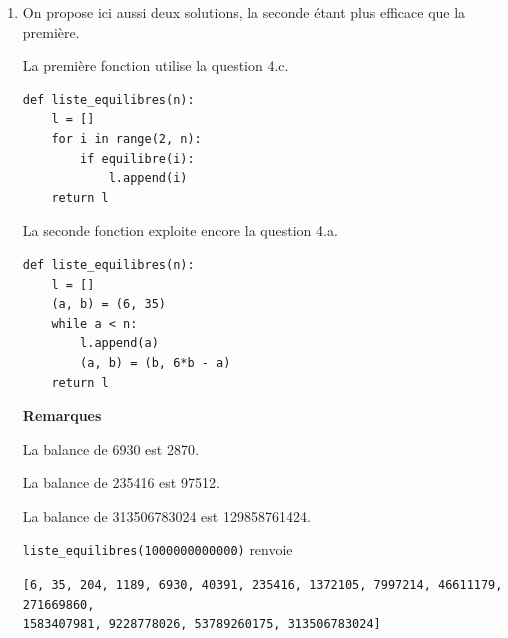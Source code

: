 \begin{enumerate}
\begin{enumerate}
    Mais on peut aussi écrire la fonction suivante, de complexité bien meilleure, en exploitant la question 4.a.
    
    \begin{verbatim}
def equilibre(n):
    (a, b) = (6, 35)
    while a < n:
        (a, b) = (b, 6*b - a)
    return a == n
    \end{verbatim}
\end{enumerate}

\item \textbf{} On propose ici aussi deux solutions, la seconde étant plus efficace que la première.

La première fonction utilise la question 4.c.

\begin{verbatim}
def liste_equilibres(n):
    l = []
    for i in range(2, n):
        if equilibre(i):
            l.append(i)
    return l
\end{verbatim}

La seconde fonction exploite encore la question 4.a.

\begin{verbatim}
def liste_equilibres(n):
    l = []
    (a, b) = (6, 35)
    while a < n:
        l.append(a)
        (a, b) = (b, 6*b - a)
    return l
\end{verbatim}

\textbf{Remarques}

La balance de 6930 est 2870.

La balance de 235416 est 97512.

La balance de 313506783024 est 129858761424.

\texttt{liste\_equilibres(1000000000000)} renvoie

\texttt{[6, 35, 204, 1189, 6930, 40391, 235416, 1372105, 7997214, 46611179, 271669860, \\1583407981, 9228778026, 53789260175, 313506783024]}




\end{enumerate}
